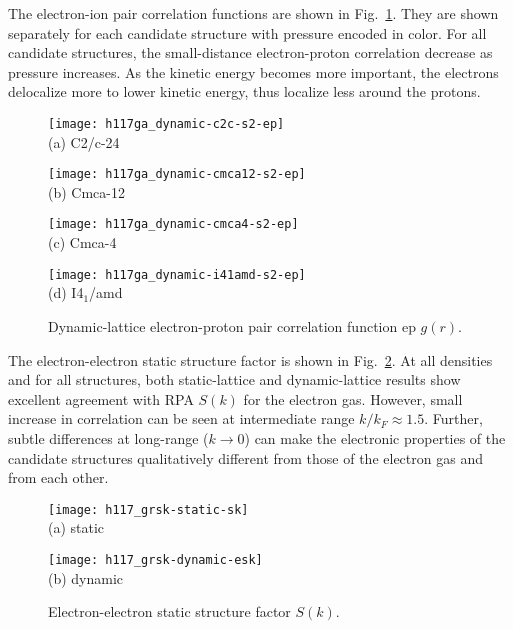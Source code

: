 The electron-ion pair correlation functions are shown in Fig.~\ref{fig:hsolid-epgr}.
They are shown separately for each candidate structure with pressure encoded in color.
For all candidate structures, the small-distance electron-proton correlation decrease as pressure increases.
As the kinetic energy becomes more important, the electrons delocalize more to lower kinetic energy, thus localize less around the protons.

\begin{figure}[h]
\centering
\begin{minipage}{0.49\textwidth}
\centering
\texttt{[image: h117ga\_dynamic-c2c-s2-ep]}\\
(a) C2/c-24
\end{minipage}
\begin{minipage}{0.49\textwidth}
\centering
\texttt{[image: h117ga\_dynamic-cmca12-s2-ep]}\\
(b) Cmca-12
\end{minipage}
\begin{minipage}{0.49\textwidth}
\centering
\texttt{[image: h117ga\_dynamic-cmca4-s2-ep]}\\
(c) Cmca-4
\end{minipage}
\begin{minipage}{0.49\textwidth}
\centering
\texttt{[image: h117ga\_dynamic-i41amd-s2-ep]}\\
(d) I4$_1$/amd
\end{minipage}
\caption{Dynamic-lattice electron-proton pair correlation function ep $g(r)$.}
\label{fig:hsolid-epgr}
\end{figure}

The electron-electron static structure factor is shown in Fig.~\ref{fig:hsolid-esk}.
At all densities and for all structures, both static-lattice and dynamic-lattice results show excellent agreement with RPA $S(k)$ for the electron gas.
However, small increase in correlation can be seen at intermediate range $k/k_F\approx 1.5$.
Further, subtle differences at long-range ($k\rightarrow0$) can make the electronic properties of the candidate structures qualitatively different from those of the electron gas and from each other.

\begin{figure}[h]
\centering
\begin{minipage}{0.49\textwidth}
\centering
\texttt{[image: h117\_grsk-static-sk]}\\
(a) static
\end{minipage}
\begin{minipage}{0.49\textwidth}
\centering
\texttt{[image: h117\_grsk-dynamic-esk]}\\
(b) dynamic
\end{minipage}
\caption{Electron-electron static structure factor $S(k)$.}
\label{fig:hsolid-esk}
\end{figure}

